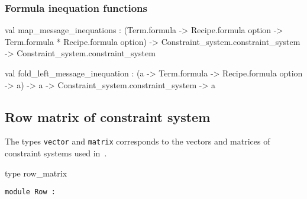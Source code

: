 \begin{ocamldocsigend}
\begin{ocamldocdescription}
\end{ocamldocdescription}


\subsubsection{Formula inequation functions}


\label{val:Constraint-underscoresystem.Phase-underscore2.map-underscoremessage-underscoreinequations}\begin{ocamldoccode}
val map_message_inequations :
  (Term.formula ->
   Recipe.formula option -> Term.formula * Recipe.formula option) ->
  Constraint_system.constraint_system -> Constraint_system.constraint_system
\end{ocamldoccode}


\label{val:Constraint-underscoresystem.Phase-underscore2.fold-underscoreleft-underscoremessage-underscoreinequation}\begin{ocamldoccode}
val fold_left_message_inequation :
  ({\textquotesingle}a -> Term.formula -> Recipe.formula option -> {\textquotesingle}a) ->
  {\textquotesingle}a -> Constraint_system.constraint_system -> {\textquotesingle}a
\end{ocamldoccode}
\end{ocamldocsigend}






\subsection{Row matrix of constraint system}




The types {\tt{vector}} and {\tt{matrix}} corresponds to the vectors and matrices of constraint
    systems used in~. 



\label{type:Constraint-underscoresystem.row-underscorematrix}\begin{ocamldoccode}
type row_matrix 
\end{ocamldoccode}




\begin{ocamldoccode}
{\tt{module }}{\tt{Row}}{\tt{ : }}\end{ocamldoccode}
\label{module:Constraint-underscoresystem.Row}

